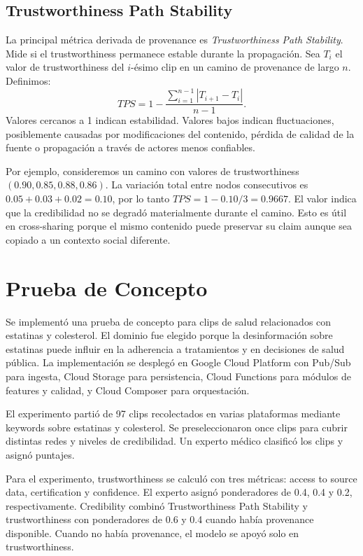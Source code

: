 \documentclass[sigconf, nonacm]{acmart}
\begin{document}
\subsection{Trustworthiness Path Stability}

La principal m\'etrica derivada de provenance es \emph{Trustworthiness Path
Stability}. Mide si el trustworthiness permanece estable durante la propagaci\'on.
Sea $T_i$ el valor de trustworthiness del $i$-\'esimo clip en un camino de provenance
de largo $n$. Definimos:
\begin{equation}
  TPS = 1 - \frac{\sum_{i=1}^{n-1}|T_{i+1}-T_i|}{n-1}.
\end{equation}
Valores cercanos a 1 indican estabilidad. Valores bajos indican fluctuaciones,
posiblemente causadas por modificaciones del contenido, p\'erdida de calidad de la
fuente o propagaci\'on a trav\'es de actores menos confiables.

Por ejemplo, consideremos un camino con valores de trustworthiness
$(0.90,0.85,0.88,0.86)$. La variaci\'on total entre nodos consecutivos es
$0.05+0.03+0.02=0.10$, por lo tanto $TPS=1-0.10/3=0.9667$. El valor indica que la
credibilidad no se degrad\'o materialmente durante el camino. Esto es \'util en
cross-sharing porque el mismo contenido puede preservar su claim aunque sea copiado
a un contexto social diferente.

\section{Prueba de Concepto}

Se implement\'o una prueba de concepto para clips de salud relacionados con
estatinas y colesterol. El dominio fue elegido porque la desinformaci\'on sobre
estatinas puede influir en la adherencia a tratamientos y en decisiones de salud
p\'ublica. La implementaci\'on se despleg\'o en Google Cloud Platform con Pub/Sub
para ingesta, Cloud Storage para persistencia, Cloud Functions para m\'odulos de
features y calidad, y Cloud Composer para orquestaci\'on.

El experimento parti\'o de 97 clips recolectados en varias plataformas mediante
keywords sobre estatinas y colesterol. Se preseleccionaron once clips para cubrir
distintas redes y niveles de credibilidad. Un experto m\'edico clasific\'o los clips y
asign\'o puntajes.

Para el experimento, trustworthiness se calcul\'o con tres m\'etricas: access to source
data, certification y confidence. El experto asign\'o ponderadores de 0.4, 0.4 y 0.2,
respectivamente. Credibility combin\'o Trustworthiness Path Stability y
trustworthiness con ponderadores de 0.6 y 0.4 cuando hab\'ia provenance disponible.
Cuando no hab\'ia provenance, el modelo se apoy\'o solo en trustworthiness.
\end{document}
